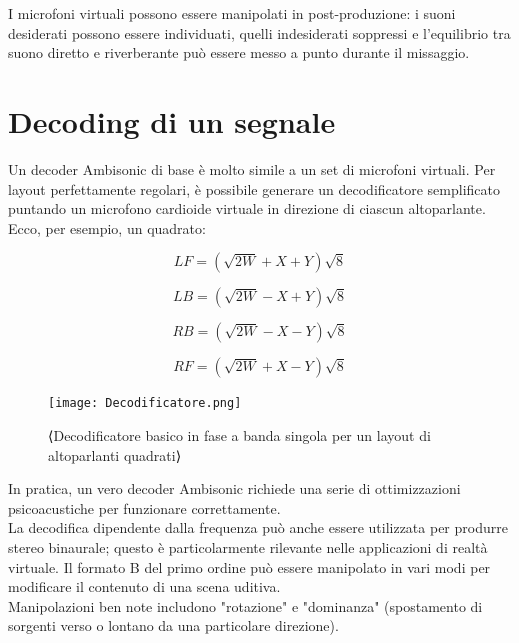 I microfoni virtuali possono essere manipolati in post-produzione: i suoni desiderati possono essere individuati,
 quelli indesiderati soppressi e l'equilibrio tra suono diretto e riverberante può essere messo a punto durante il missaggio.
 
\section{Decoding di un segnale}

Un decoder Ambisonic di base è molto simile a un set di microfoni virtuali.
Per layout perfettamente regolari, è possibile generare un decodificatore semplificato puntando un microfono cardioide virtuale in direzione di ciascun altoparlante.
\\Ecco, per esempio, un quadrato:

\begin{equation}
      LF = ({\sqrt{2W}} + X + Y){\sqrt{8}}
\end{equation}

\begin{equation}
      LB = ({\sqrt{2W}} - X + Y){\sqrt{8}}
\end{equation}

\begin{equation}
      RB = ({\sqrt{2W}} - X - Y){\sqrt{8}}
\end{equation}

\begin{equation}
      RF = ({\sqrt{2W}} + X - Y){\sqrt{8}}
\end{equation}

\begin{figure}[h]
      \centering
      \texttt{[image: Decodificatore.png]}
      \caption{⟨Decodificatore basico in fase a banda singola per un layout di altoparlanti quadrati⟩}
      \label{fig:⟨etichetta⟩}
      \end{figure}

      In pratica, un vero decoder Ambisonic richiede una serie di ottimizzazioni psicoacustiche per funzionare correttamente.\\
      La decodifica dipendente dalla frequenza può anche essere utilizzata per produrre stereo binaurale;
      questo è particolarmente rilevante nelle applicazioni di realtà virtuale.
      Il formato B del primo ordine può essere manipolato in vari modi per modificare il contenuto di una scena uditiva. \\
      Manipolazioni ben note includono "rotazione" e "dominanza" (spostamento di sorgenti verso o lontano da una particolare direzione).

